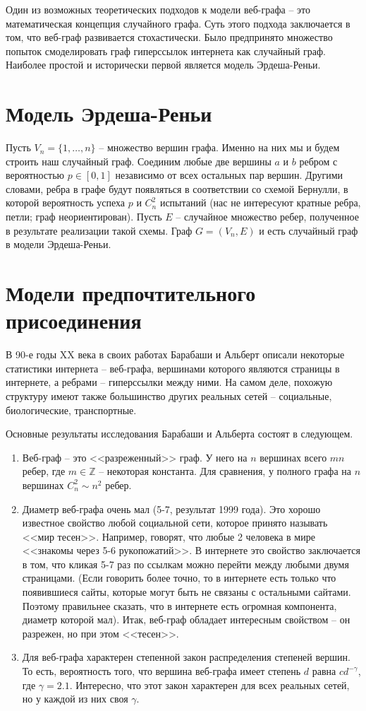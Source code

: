 \documentclass[14pt]{extreport}
\begin{document}
Один из возможных теоретических подходов к модели веб-графа -- это математическая концепция случайного графа. Суть этого подхода заключается в том, что веб-граф развивается стохастически.
Было предпринято множество попыток смоделировать граф гиперссылок интернета как случайный граф. Наиболее простой и исторически первой является модель Эрдеша-Реньи.

\section{Модель Эрдеша-Реньи}  
Пусть $V_n = \{1,\dots,n\}$ -- множество вершин графа. Именно на них мы и будем строить наш случайный граф. Соединим любые две вершины $a$ и $b$ ребром с вероятностью $p \in [0, 1]$ независимо от всех остальных пар вершин. Другими словами, ребра в графе будут появляться в соответствии со схемой Бернулли, в которой вероятность успеха $p$ и $C_n^2$ испытаний (нас не интересуют кратные ребра, петли; граф неориентирован). Пусть $E$ -- случайное множество ребер, полученное в результате реализации такой схемы. Граф $G = (V_n, E)$ и есть случайный граф в модели Эрдеша-Реньи.

\section{Модели предпочтительного присоединения}
В 90-е годы XX века в своих работах Барабаши и Альберт описали некоторые статистики интернета -- веб-графа, вершинами которого являются страницы в интернете, а ребрами -- гиперссылки между ними. На самом деле, похожую структуру имеют также большинство других реальных сетей -- социальные, биологические, транспортные.

Основные результаты исследования Барабаши и Альберта состоят в следующем.
\begin{enumerate}

\item Веб-граф -- это <<разреженный>> граф. У него на $n$ вершинах всего $mn$ ребер, где $m \in \mathbb{Z}$ -- некоторая константа. Для сравнения, у полного графа на $n$ вершинах $C_n^2 \sim n^2$ ребер. 

\item Диаметр веб-графа очень мал (5-7, результат 1999 года). Это хорошо известное свойство любой социальной сети, которое принято называть <<мир тесен>>. Например, говорят, что любые 2 человека в мире <<знакомы через 5-6 рукопожатий>>. В интернете это свойство заключается в том, что кликая 5-7 раз по ссылкам можно перейти между любыми двумя страницами. (Если говорить более точно, то в интернете есть только что появившиеся сайты, которые могут быть не связаны с остальными сайтами. Поэтому правильнее сказать, что в интернете есть огромная компонента, диаметр которой мал). Итак, веб-граф обладает интересным свойством -- он разрежен, но при этом <<тесен>>.

\item Для веб-графа характерен степенной закон распределения степеней вершин. То есть, вероятность того, что вершина веб-графа имеет степень $d$ равна $cd^{-\gamma}$, где $\gamma = 2.1$. Интересно, что этот закон характерен для всех реальных сетей, но у каждой из них своя $\gamma$.
\end{enumerate}
\end{document}
